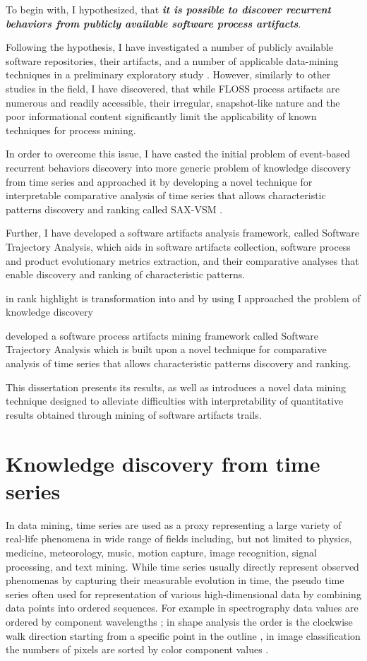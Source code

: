 To begin with, I hypothesized, that \textbf{\textit{it is possible to discover recurrent behaviors from 
publicly available software process artifacts}}. 

Following the hypothesis, I have investigated a number of publicly available software repositories,
their artifacts, and a number of applicable data-mining techniques in a preliminary exploratory study 
\cite{csdl2-10-09}. However, similarly to other studies in the field, I have discovered, that while FLOSS 
process artifacts are numerous and readily accessible, their irregular, snapshot-like nature and the poor 
informational content significantly limit the applicability of known techniques for process mining.

In order to overcome this issue, I have casted the initial problem of event-based recurrent behaviors 
discovery into more generic problem of knowledge discovery from time series and approached it
by developing a novel technique for interpretable comparative analysis of time series that allows 
characteristic patterns discovery and ranking called SAX-VSM \cite{sax-vsm}. 

Further, I have developed a software artifacts analysis framework, called Software Trajectory Analysis, 
which aids in software artifacts collection, software process and product evolutionary metrics extraction, 
and their comparative analyses that enable discovery and ranking of characteristic patterns.


 in rank highlight is  transformation into  and by using I approached the problem of knowledge discovery 

developed a 
software process artifacts mining framework called Software Trajectory Analysis which is built upon 
a novel technique for comparative analysis of time series that allows characteristic patterns discovery 
and ranking.

This dissertation presents its results, as well as introduces a novel data mining technique designed to 
alleviate difficulties with interpretability of quantitative results obtained through mining of software
artifacts trails. 

%
%
\section{Knowledge discovery from time series}\label{section_knowledge_discovery}
In data mining, time series are used as a proxy representing a large variety of real-life phenomena 
in wide range of fields including, but not limited to physics, medicine, meteorology, 
music, motion capture, image recognition, signal processing, and text mining. 
While time series usually directly represent observed phenomenas by capturing their measurable evolution 
in time, the pseudo time series often used for representation of various high-dimensional data 
by combining data points into ordered sequences. 
For example in spectrography data values are ordered by component wavelengths \cite{citeulike:12550833};
in shape analysis the order is the clockwise walk direction starting from a
specific point in the outline \cite{citeulike:12550835}, in image classification the numbers of pixels
are sorted by color component values \cite{citeulike:2900542}.

